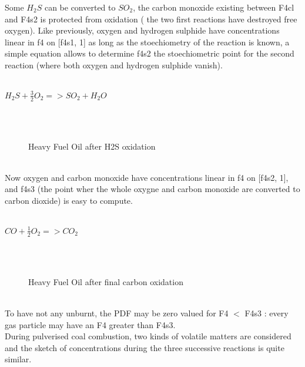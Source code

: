 Some $H_{2}S$ can be converted to $SO_{2}$, the carbon monoxide
existing between F4cl and F4s2 is protected from oxidation ({\small
the two first reactions have destroyed free oxygen}). Like previously,
oxygen and hydrogen sulphide have concentrations linear in f4 on
[f4s1, 1] as long as the stoechiometry of the reaction is known, a
simple equation allows to determine f4s2 the stoechiometric point for
the second reaction ({\small where both oxygen and hydrogen sulphide
vanish}).\\
\\
\centerline{$H_{2}S + \frac{3}{2} O_{2} => SO_{2} + H_{2}O $ }\\
\\
\begin{figure}[h!]
\caption{Heavy Fuel Oil after H2S oxidation}
\end{figure}
\\
Now oxygen and carbon monoxide have concentrations linear in f4 on
[f4s2, 1], and f4s3 ({\small the point wher the whole oxygne and
carbon monoxide are converted to carbon dioxide}) is easy to
compute.\\
\\
\centerline{$CO + \frac{1}{2} O_{2} => CO_{2} $ }\\
\\
\begin{figure}[h!]
\caption{Heavy Fuel Oil after final carbon oxidation}
\end{figure}
\\
To have not any unburnt, the PDF may be zero valued for F4 $<$ F4s3 :
every gas particle may have an F4 greater than F4s3.\\

During pulverised coal combustion, two kinds of volatile matters are
considered and the sketch of concentrations during the three
successive reactions is quite similar.\\


